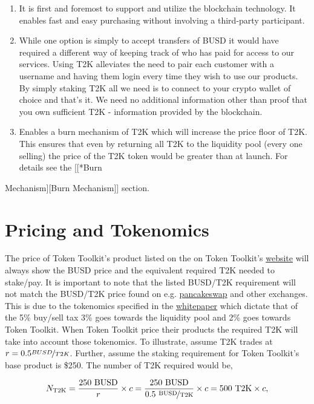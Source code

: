 \documentclass[11pt]{article}
\begin{document}
\begin{enumerate}
\item It is first and foremost to support and utilize the blockchain technology. It
enables fast and easy purchasing without involving a third-party participant.
\item While one option is simply to accept transfers of BUSD it would have required
a different way of keeping track of who has paid for access to our services.
Using T2K alleviates the need to pair each customer with a username and
having them login every time they wish to use our products. By simply staking
T2K all we need is to connect to your crypto wallet of choice and that's it.
We need no additional information other than proof that you own sufficient
T2K - information provided by the blockchain.
\item Enables a burn mechanism of T2K which will increase the price floor of T2K.
This ensures that even by returning all T2K to the liquidity pool (every one
selling) the price of the T2K token would be greater than at launch. For
details see the [[*Burn
\end{enumerate}
Mechanism][Burn Mechanism]] section.

\section*{Pricing and Tokenomics}
\label{sec:orge58544d}

The price of Token Toolkit's product listed on the on Token Toolkit's \href{https://tokentoolkit.io/\#}{website}
will always show the BUSD price and the equivalent required T2K needed to
stake/pay. It is important to note that the listed BUSD/T2K requirement will not
match the BUSD/T2K price found on e.g. \href{https://pancakeswap.finance/}{pancakeswap} and other exchanges. This is
due to the tokenomics specified in the \href{https://docs.tokentoolkit.io/welcome/what-is-token-toolkit}{whitepaper} which dictate that of the 5\%
buy/sell tax 3\% goes towards the liquidity pool and 2\% goes towards Token
Toolkit. When Token Toolkit price their products the required T2K will take into
account those tokenomics. To illustrate, assume T2K trades at \(r=0.5
\nicefrac{BUSD}{T2K}\). Further, assume the staking requirement for Token
Toolkit's base product is \$250. The number of T2K required would be,

$$
N_{{\text{T2K}}} = \frac{250~\text{BUSD}}{r} \times c = \frac{250~\text{BUSD}}{0.5~\text{\nicefrac{BUSD}{T2K}}} \times c = 500~\text{T2K} \times c,
$$
\end{document}
